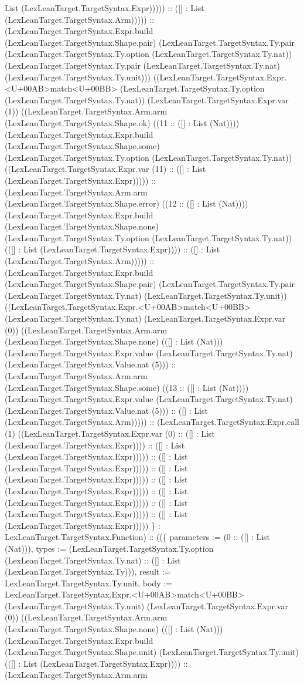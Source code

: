 \documentclass[11pt]{article}
\begin{document}
List (LexLeanTarget.TargetSyntax.Expr))))) :: ([] : List (LexLeanTarget.TargetSyntax.Arm))))) :: (LexLeanTarget.TargetSyntax.Expr.build (LexLeanTarget.TargetSyntax.Shape.pair) (LexLeanTarget.TargetSyntax.Ty.pair (LexLeanTarget.TargetSyntax.Ty.option (LexLeanTarget.TargetSyntax.Ty.nat)) (LexLeanTarget.TargetSyntax.Ty.pair (LexLeanTarget.TargetSyntax.Ty.nat) (LexLeanTarget.TargetSyntax.Ty.unit))) ((LexLeanTarget.TargetSyntax.Expr.<U+00AB>match<U+00BB> (LexLeanTarget.TargetSyntax.Ty.option (LexLeanTarget.TargetSyntax.Ty.nat)) (LexLeanTarget.TargetSyntax.Expr.var (1)) ((LexLeanTarget.TargetSyntax.Arm.arm (LexLeanTarget.TargetSyntax.Shape.ok) ((11 :: ([] : List (Nat)))) (LexLeanTarget.TargetSyntax.Expr.build (LexLeanTarget.TargetSyntax.Shape.some) (LexLeanTarget.TargetSyntax.Ty.option (LexLeanTarget.TargetSyntax.Ty.nat)) ((LexLeanTarget.TargetSyntax.Expr.var (11) :: ([] : List (LexLeanTarget.TargetSyntax.Expr))))) :: (LexLeanTarget.TargetSyntax.Arm.arm (LexLeanTarget.TargetSyntax.Shape.error) ((12 :: ([] : List (Nat)))) (LexLeanTarget.TargetSyntax.Expr.build (LexLeanTarget.TargetSyntax.Shape.none) (LexLeanTarget.TargetSyntax.Ty.option (LexLeanTarget.TargetSyntax.Ty.nat)) (([] : List (LexLeanTarget.TargetSyntax.Expr)))) :: ([] : List (LexLeanTarget.TargetSyntax.Arm))))) :: (LexLeanTarget.TargetSyntax.Expr.build (LexLeanTarget.TargetSyntax.Shape.pair) (LexLeanTarget.TargetSyntax.Ty.pair (LexLeanTarget.TargetSyntax.Ty.nat) (LexLeanTarget.TargetSyntax.Ty.unit)) ((LexLeanTarget.TargetSyntax.Expr.<U+00AB>match<U+00BB> (LexLeanTarget.TargetSyntax.Ty.nat) (LexLeanTarget.TargetSyntax.Expr.var (0)) ((LexLeanTarget.TargetSyntax.Arm.arm (LexLeanTarget.TargetSyntax.Shape.none) (([] : List (Nat))) (LexLeanTarget.TargetSyntax.Expr.value (LexLeanTarget.TargetSyntax.Ty.nat) (LexLeanTarget.TargetSyntax.Value.nat (5))) :: (LexLeanTarget.TargetSyntax.Arm.arm (LexLeanTarget.TargetSyntax.Shape.some) ((13 :: ([] : List (Nat)))) (LexLeanTarget.TargetSyntax.Expr.value (LexLeanTarget.TargetSyntax.Ty.nat) (LexLeanTarget.TargetSyntax.Value.nat (5))) :: ([] : List (LexLeanTarget.TargetSyntax.Arm))))) :: (LexLeanTarget.TargetSyntax.Expr.call (1) ((LexLeanTarget.TargetSyntax.Expr.var (0) :: ([] : List (LexLeanTarget.TargetSyntax.Expr)))) :: ([] : List (LexLeanTarget.TargetSyntax.Expr))))) :: ([] : List (LexLeanTarget.TargetSyntax.Expr))))) :: ([] : List (LexLeanTarget.TargetSyntax.Expr))))) :: ([] : List (LexLeanTarget.TargetSyntax.Expr))))) :: ([] : List (LexLeanTarget.TargetSyntax.Expr))))) :: ([] : List (LexLeanTarget.TargetSyntax.Expr))))) :: ([] : List (LexLeanTarget.TargetSyntax.Expr))))) \} : LexLeanTarget.TargetSyntax.Function) :: ((\{ parameters := (0 :: ([] : List (Nat))), types := (LexLeanTarget.TargetSyntax.Ty.option (LexLeanTarget.TargetSyntax.Ty.nat) :: ([] : List (LexLeanTarget.TargetSyntax.Ty))), result := LexLeanTarget.TargetSyntax.Ty.unit, body := LexLeanTarget.TargetSyntax.Expr.<U+00AB>match<U+00BB> (LexLeanTarget.TargetSyntax.Ty.unit) (LexLeanTarget.TargetSyntax.Expr.var (0)) ((LexLeanTarget.TargetSyntax.Arm.arm (LexLeanTarget.TargetSyntax.Shape.none) (([] : List (Nat))) (LexLeanTarget.TargetSyntax.Expr.build (LexLeanTarget.TargetSyntax.Shape.unit) (LexLeanTarget.TargetSyntax.Ty.unit) (([] : List (LexLeanTarget.TargetSyntax.Expr)))) :: (LexLeanTarget.TargetSyntax.Arm.arm 
\end{document}
